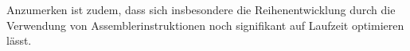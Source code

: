 \documentclass[course=erap] {aspdoc}
\begin{document}
    Anzumerken ist zudem, dass sich insbesondere die Reihenentwicklung durch die Verwendung von Assemblerinstruktionen noch signifikant auf Laufzeit optimieren lässt. 

    
    
\end{document}
